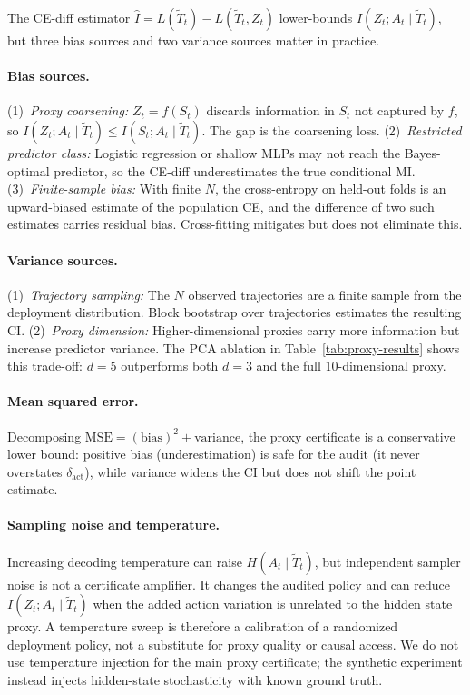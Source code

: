 \documentclass{article}
\begin{document}
The CE-diff estimator $\hat I = L(\tilde T_t) - L(\tilde T_t, Z_t)$ lower-bounds $I(Z_t; A_t \mid \tilde T_t)$, but three bias sources and two variance sources matter in practice.

\paragraph{Bias sources.}
(1)~\emph{Proxy coarsening:} $Z_t = f(S_t)$ discards information in $S_t$ not captured by $f$, so $I(Z_t; A_t \mid \tilde T_t) \leq I(S_t; A_t \mid \tilde T_t)$. The gap is the coarsening loss.
(2)~\emph{Restricted predictor class:} Logistic regression or shallow MLPs may not reach the Bayes-optimal predictor, so the CE-diff underestimates the true conditional MI.
(3)~\emph{Finite-sample bias:} With finite $N$, the cross-entropy on held-out folds is an upward-biased estimate of the population CE, and the difference of two such estimates carries residual bias. Cross-fitting mitigates but does not eliminate this.

\paragraph{Variance sources.}
(1)~\emph{Trajectory sampling:} The $N$ observed trajectories are a finite sample from the deployment distribution. Block bootstrap over trajectories estimates the resulting CI.
(2)~\emph{Proxy dimension:} Higher-dimensional proxies carry more information but increase predictor variance. The PCA ablation in Table~\ref{tab:proxy-results} shows this trade-off: $d{=}5$ outperforms both $d{=}3$ and the full 10-dimensional proxy.

\paragraph{Mean squared error.}
Decomposing $\text{MSE} = (\text{bias})^2 + \text{variance}$, the proxy certificate is a conservative lower bound: positive bias (underestimation) is safe for the audit (it never overstates $\delta_\text{act}$), while variance widens the CI but does not shift the point estimate.

\paragraph{Sampling noise and temperature.}
Increasing decoding temperature can raise $H(A_t \mid \tilde T_t)$, but independent sampler noise is not a certificate amplifier. It changes the audited policy and can reduce $I(Z_t; A_t \mid \tilde T_t)$ when the added action variation is unrelated to the hidden state proxy. A temperature sweep is therefore a calibration of a randomized deployment policy, not a substitute for proxy quality or causal access. We do not use temperature injection for the main proxy certificate; the synthetic experiment instead injects hidden-state stochasticity with known ground truth.
\end{document}
